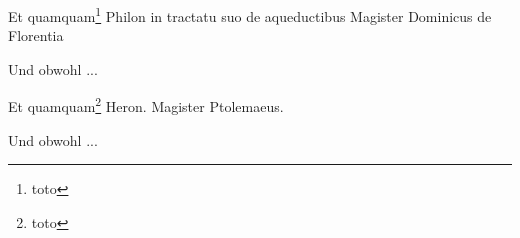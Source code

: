 \documentclass{book}
\begin{document}
\begin{ledgroup}
\begin{pairs}
\begin{Leftside}
\beginnumbering
\pstart
Et quamquam\footnote{toto} Philon in tractatu suo de aqueductibus Magister Dominicus de Florentia
\pend
\endnumbering
\end{Leftside}

\begin{Rightside}
\beginnumbering
\pstart
Und obwohl ...
\pend
\endnumbering
\end{Rightside}

\end{pairs}
\Columns
\end{ledgroup}




\begin{ledgroup}
\setcounter{footnoteC}{0}
\setcounter{footnote}{0}
\begin{pairs}
\begin{Leftside}
\beginnumbering
\pstart
Et quamquam\footnote{toto} Heron. Magister Ptolemaeus.
\pend
\endnumbering
\end{Leftside}

\begin{Rightside}
\beginnumbering
\pstart
Und obwohl ...
\pend
\endnumbering
\end{Rightside}

\end{pairs}
\Columns
\end{ledgroup}
\end{document}
